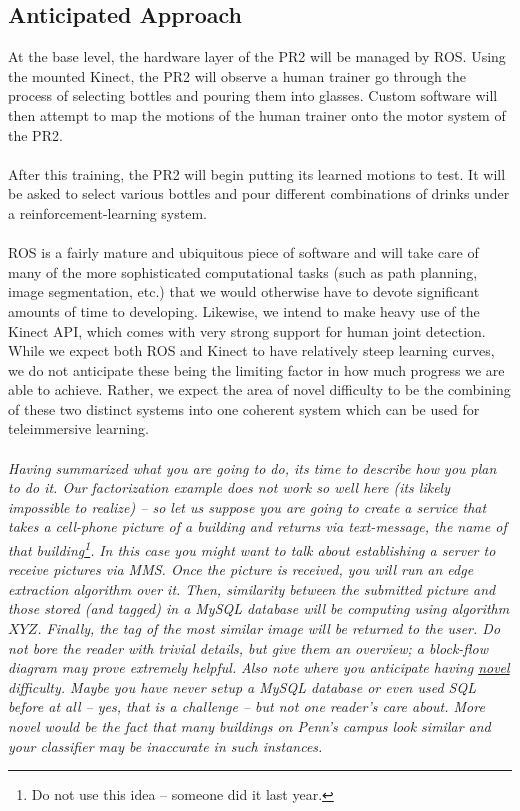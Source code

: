\documentclass{sig-alternate}
\begin{document}
\subsection{Anticipated Approach}
\label{subsec:approach}
At the base level, the hardware layer of the PR2 will be managed by ROS.
Using the mounted Kinect, the PR2 will observe a human trainer go
through the process of selecting bottles and pouring them into glasses. Custom 
software will then attempt to map the motions of the human trainer onto the 
motor system of the PR2.
\\
\\After this training, the PR2 will begin putting its learned motions to test.
It will be asked to select various bottles and  pour different combinations of
drinks under a reinforcement-learning system.
\\
\\ROS is a fairly mature and ubiquitous piece of software and will take care of
many of the more sophisticated computational tasks (such as path planning, 
image segmentation, etc.) that we would otherwise have to devote significant 
amounts of time to developing.  
Likewise, we intend to make heavy use of the Kinect API, which comes with very
strong support for human joint detection.
While we expect both ROS and Kinect to have relatively steep learning curves,
we do not anticipate these being the limiting factor in how much progress we
are able to achieve. 
Rather, we expect the area of novel difficulty to be the combining of these
two distinct systems into one coherent system which can be used for
teleimmersive learning.
\\
\\\emph{Having summarized \textit{what} you are going to do, its time to describe \textit{how} you plan to do it. Our factorization example does not work so well here (its likely impossible to realize) -- so let us suppose you are going to create a service that takes a cell-phone picture of a building and returns via text-message, the name of that building\footnote{Do not use this idea -- someone did it last year.}.}
\emph{
In this case you might want to talk about establishing a server to receive pictures via MMS. Once the picture is received, you will run an edge extraction algorithm over it. Then, similarity between the submitted picture and those stored (and tagged) in a MySQL database will be computing using algorithm $XYZ$. Finally, the tag of the most similar image will be returned to the user. Do not bore the reader with trivial details, but give them an overview; a block-flow diagram may prove extremely helpful.}
\emph{
Also note where you anticipate having \underline{novel} difficulty. Maybe you have never setup a MySQL database or even used SQL before at all -- yes, that is a challenge -- but not one reader's care about. More novel would be the fact that many buildings on Penn's campus look similar and your classifier may be inaccurate in such instances.}
\end{document}

